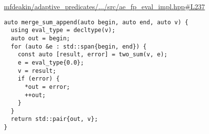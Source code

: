 \href{https://github.com/mfdeakin/adaptive_predicates/blob/main/src/ae_fp_eval_impl.hpp#L237}{mfdeakin/adaptive\_predicates/.../src/ae\_fp\_eval\_impl.hpp\#L237}
\begin{lstlisting}[basicstyle=\small\ttfamily]
auto merge_sum_append(auto begin, auto end, auto v) {
  using eval_type = decltype(v);
  auto out = begin;
  for (auto &e : std::span{begin, end}) {
    const auto [result, error] = two_sum(v, e);
    e = eval_type{0.0};
    v = result;
    if (error) {
      *out = error;
      ++out;
    }
  }
  return std::pair{out, v};
}
\end{lstlisting}
